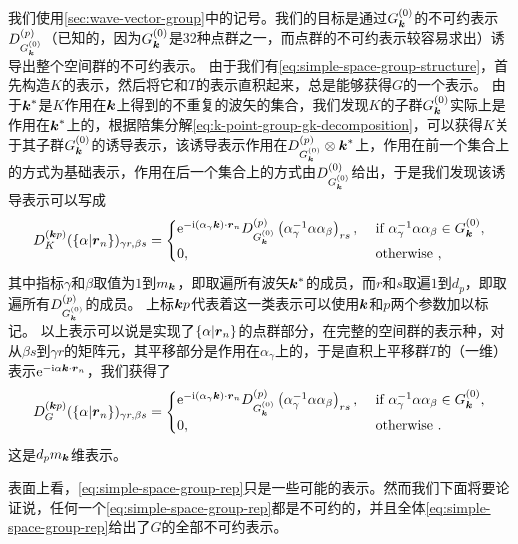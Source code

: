 我们使用\autoref{sec:wave-vector-group}中的记号。我们的目标是通过$G^{(0)}_{\vb*{k}}$的不可约表示$D^{(p)}_{G^{(0)}_{\vb*{k}}}$（已知的，因为$G^{(0)}_{\vb*{k}}$是32种点群之一，而点群的不可约表示较容易求出）诱导出整个空间群的不可约表示。
由于我们有\eqref{eq:simple-space-group-structure}，首先构造$K$的表示，然后将它和$T$的表示直积起来，总是能够获得$G$的一个表示。
由于$\vb*{k}^*$是$K$作用在$\vb*{k}$上得到的不重复的波矢的集合，我们发现$K$的子群$G^{(0)}_{\vb*{k}}$实际上是作用在$\vb*{k}^*$上的，根据陪集分解\eqref{eq:k-point-group-gk-decomposition}，可以获得$K$关于其子群$G^{(0)}_{\vb*{k}}$的诱导表示，该诱导表示作用在$D^{(p)}_{G^{(0)}_{\vb*{k}}} \otimes \vb*{k}^*$上，作用在前一个集合上的方式为基础表示，作用在后一个集合上的方式由$D^{(0)}_{G^{(0)}_{\vb*{k}}}$给出，于是我们发现该诱导表示可以写成
\[
    D^{(\vb*{k} p)}_{K}(\{\alpha | \vb*{r}_n \})_{\gamma r, \beta s} = \begin{cases}\mathrm{e}^{-\mathrm{i}\left(\alpha_{\gamma} \vb*{k} \right) \cdot \vb*{r}_{n}} D_{G_{\vb*{k}}^{(0)}}^{(p)}\left(\alpha_{\gamma}^{-1} \alpha \alpha_{\beta}\right)_{r s}, & \text { if } \alpha_{\gamma}^{-1} \alpha \alpha_{\beta} \in G_{\vb*{k}}^{(0)}, \\ 0, & \text { otherwise },\end{cases}
\]
其中指标$\gamma$和$\beta$取值为$1$到$m_{\vb*{k}}$，即取遍所有波矢$\vb*{k}^*$的成员，而$r$和$s$取遍$1$到$d_p$，即取遍所有$D^{(p)}_{G^{(0)}_{\vb*{k}}}$的成员。
上标$\vb*{k} p$代表着这一类表示可以使用$\vb*{k}$和$p$两个参数加以标记。
以上表示可以说是实现了$\{\alpha | \vb*{r}_n \}$的点群部分，在完整的空间群的表示种，对从$\beta s$到$\gamma r$的矩阵元，其平移部分是作用在$\alpha_\gamma$上的，于是直积上平移群$T$的（一维）表示$\mathrm{e}^{- \mathrm{i} \alpha \vb*{k} \cdot \vb*{r}_n}$，我们获得了
\begin{equation}
    D^{(\vb*{k} p)}_{G}(\{\alpha | \vb*{r}_n \})_{\gamma r, \beta s} = \begin{cases}\mathrm{e}^{-\mathrm{i}\left(\alpha_{\gamma} \vb*{k} \right) \cdot \vb*{r}_{n}} D_{G_{\vb*{k}}^{(0)}}^{(p)}\left(\alpha_{\gamma}^{-1} \alpha \alpha_{\beta}\right)_{r s}, & \text { if } \alpha_{\gamma}^{-1} \alpha \alpha_{\beta} \in G_{\vb*{k}}^{(0)}, \\ 0, & \text { otherwise }.\end{cases}
    \label{eq:simple-space-group-rep}
\end{equation}
这是$d_p m_{\vb*{k}}$维表示。

表面上看，\eqref{eq:simple-space-group-rep}只是一些可能的表示。然而我们下面将要论证说，任何一个\eqref{eq:simple-space-group-rep}都是不可约的，并且全体\eqref{eq:simple-space-group-rep}给出了$G$的全部不可约表示。

